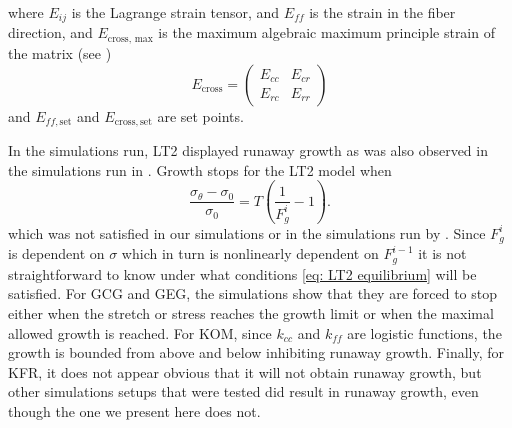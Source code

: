 where $E_{ij}$ is the Lagrange strain tensor, and $E_{ff}$ is the strain in the fiber direction, and $E_\text{cross, max}$ is the maximum algebraic maximum principle strain of the matrix (see \citep{Witzenburg2018})
\begin{equation*}
    E_\text{cross} = \begin{pmatrix}
        E_{cc} & E_{cr} \\
        E_{rc} & E_{rr}
    \end{pmatrix}
\end{equation*}
and $E_{ff, \mathrm{set}}$ and $E_\mathrm{cross, set}$ are set points. \par
In the simulations run, LT2 displayed runaway growth as was also observed in the simulations run in \citep{Witzenburg2018}. Growth stops for the LT2 model when \begin{equation*}
\label{eq: LT2 equilibrium}
    \frac{\sigma_{\theta} - \sigma_{0}}{\sigma_{0}} = T\left(\frac{1}{F_{g}^i} - 1\right).
\end{equation*}
which was not satisfied in our simulations or in the simulations run by \citep{Witzenburg2018}. Since $F_g^i$ is dependent on $\sigma$ which in turn is nonlinearly dependent on $F_g^{i-1}$ it is not straightforward to know under what conditions \ref{eq: LT2 equilibrium} will be satisfied. For GCG and GEG, the simulations show that they are forced to stop either when the stretch or stress reaches the growth limit or when the maximal allowed growth is reached. For KOM, since $k_{cc}$ and $k_{ff}$ are logistic functions, the growth is bounded from above and below inhibiting runaway growth. Finally, for KFR, it does not appear obvious that it will not obtain runaway growth, but other simulations setups that were tested did result in runaway growth, even though the one we present here does not.
